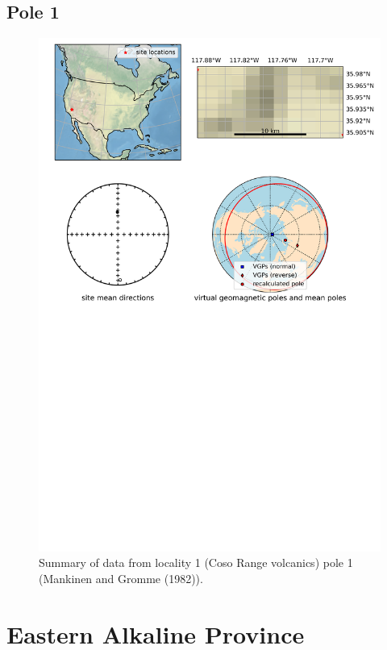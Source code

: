 \documentclass{article}
\begin{document}
\subsection{Pole 1}


\begin{figure}[H]
\centering
\includegraphics[width=5 in]{./1/1/pole_summary.png}
\caption{Summary of data from locality 1 (Coso Range volcanics) pole 1 (Mankinen and Gromme (1982)).}
\end{figure}

\section{Eastern Alkaline Province}
\end{document}
